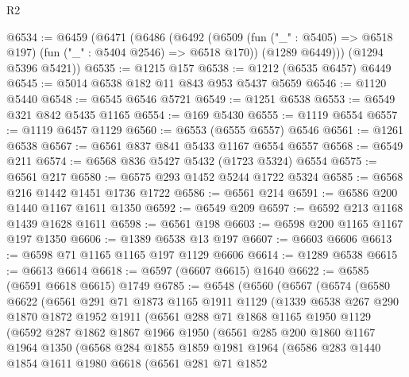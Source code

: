 \begin{lexlean}{R2}
\begin{coremodule}
@6534 := @6459
    (@6471
      (@6486
        (@6492
          (@6509 (fun ("_" : @5405) => @6518 @197) (fun ("_" : @5404 @2546) => @6518 @170))
          (@1289 @6449)))
      (@1294 @5396 @5421))
@6535 := @1215 @157
@6538 := @1212 (@6535 @6457) @6449
@6545 := @5014 @6538 @182 @11 @843 @953 @5437 @5659
@6546 := @1120 @5440
@6548 := @6545 @6546 @5721
@6549 := @1251 @6538
@6553 := @6549 @321 @842 @5435 @1165
@6554 := @169 @5430
@6555 := @1119 @6554
@6557 := @1119 @6457 @1129
@6560 := @6553 (@6555 @6557) @6546
@6561 := @1261 @6538
@6567 := @6561 @837 @841 @5433 @1167 @6554 @6557
@6568 := @6549 @211
@6574 := @6568 @836 @5427 @5432 (@1723 @5324) @6554
@6575 := @6561 @217
@6580 := @6575 @293 @1452 @5244 @1722 @5324
@6585 := @6568 @216 @1442 @1451 @1736 @1722
@6586 := @6561 @214
@6591 := @6586 @200 @1440 @1167 @1611 @1350
@6592 := @6549 @209
@6597 := @6592 @213 @1168 @1439 @1628 @1611
@6598 := @6561 @198
@6603 := @6598 @200 @1165 @1167 @197 @1350
@6606 := @1389 @6538 @13 @197
@6607 := @6603 @6606
@6613 := @6598 @71 @1165 @1165 @197 @1129 @6606
@6614 := @1289 @6538
@6615 := @6613 @6614
@6618 := @6597 (@6607 @6615) @1640
@6622 := @6585 (@6591 @6618 @6615) @1749
@6785 := @6548
    (@6560
      (@6567
        (@6574
          (@6580
            @6622
            (@6561
              @291
              @71
              @1873
              @1165
              @1911
              @1129
              (@1339
                @6538
                @267
                @290
                @1870
                @1872
                @1952
                @1911
                (@6561
                  @288
                  @71
                  @1868
                  @1165
                  @1950
                  @1129
                  (@6592
                    @287
                    @1862
                    @1867
                    @1966
                    @1950
                    (@6561
                      @285
                      @200
                      @1860
                      @1167
                      @1964
                      @1350
                      (@6568
                        @284
                        @1855
                        @1859
                        @1981
                        @1964
                        (@6586
                          @283
                          @1440
                          @1854
                          @1611
                          @1980
                          @6618
                          (@6561
                            @281
                            @71
                            @1852

\end{coremodule}
\end{lexlean}
